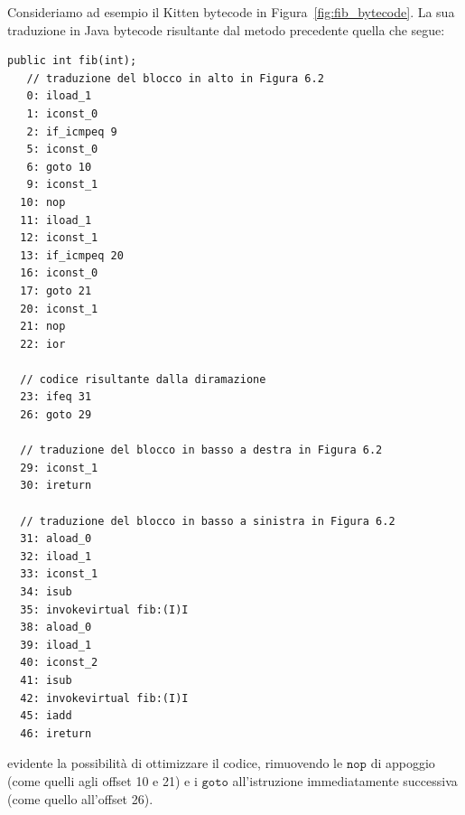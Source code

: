 Consideriamo ad esempio il Kitten bytecode in Figura~\ref{fig:fib_bytecode}. La sua
traduzione in Java bytecode risultante dal metodo precedente \e quella che segue:

{\small\begin{verbatim}
public int fib(int);
   // traduzione del blocco in alto in Figura 6.2
   0: iload_1
   1: iconst_0
   2: if_icmpeq 9
   5: iconst_0
   6: goto 10
   9: iconst_1
  10: nop
  11: iload_1
  12: iconst_1
  13: if_icmpeq 20
  16: iconst_0
  17: goto 21
  20: iconst_1
  21: nop
  22: ior

  // codice risultante dalla diramazione
  23: ifeq 31
  26: goto 29

  // traduzione del blocco in basso a destra in Figura 6.2
  29: iconst_1
  30: ireturn

  // traduzione del blocco in basso a sinistra in Figura 6.2
  31: aload_0
  32: iload_1
  33: iconst_1
  34: isub
  35: invokevirtual fib:(I)I
  38: aload_0
  39: iload_1
  40: iconst_2
  41: isub
  42: invokevirtual fib:(I)I
  45: iadd
  46: ireturn
\end{verbatim}}

\noindent
\E evidente la possibilit\`a di ottimizzare il codice, rimuovendo le $\mathtt{nop}$ di
appoggio (come quelli agli offset 10 e 21)
e i $\mathtt{goto}$ all'istruzione immediatamente successiva (come quello all'offset 26).


